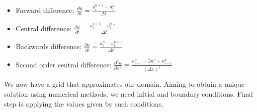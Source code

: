 \documentclass[12pt, oneside]{book}
\theoremstyle{plain}
\theoremstyle{definition}
\begin{document}
\begin{itemize}
        \item Forward difference: $ \frac{\partial u}{\partial t} = \frac{u^{n+1}_i - u^n_i}{\Delta t} $
        \item Central difference: $ \frac{\partial u}{\partial t} = \frac{u^{n+1}_i - u^{n-1}_i}{\Delta t} $
        \item Backwards difference: $ \frac{\partial u}{\partial t} = \frac{u^{n}_i - u^{n-1}_i}{\Delta t} $
        \item Second order central difference: $ \frac{\partial^2 u}{\partial x^2} = \frac{u^n_{i+1}- 2u^n_i + u^n_{i-1}}{(\Delta x)^2} $
\end{itemize}

We now have a grid that approximates our domain. Aiming to obtain a unique solution using numerical methods, we need initial and boundary conditions. Final step is applying the values given by such conditions.
\end{document}
